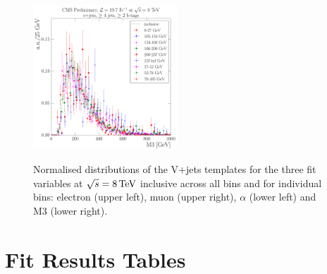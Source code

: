 \begin{figure}[hbtp]
     \includegraphics[width=0.48\textwidth]{Chapters/04_Analysis/04b_XSections/images/8TeV/fit_variables/WPT/M3/vjets/WPT_M3_2orMoreBtags_VJets_template_comparison.pdf}\\
	 \caption{Normalised distributions of the V+jets templates for the three fit variables at $\sqrt{s}=8\,\text{Te\hspace{-.08em}V}$
	 inclusive across all \wpt bins and for individual \wpt bins: electron \abseta (upper
	 left), muon \abseta (upper right), $\alpha$ (lower left) and M3 (lower right).}
     \label{fig:WPT_fit_variable_vjets_comparisons_8TeV}
\end{figure}


\clearpage
\section{Fit Results Tables}
\label{as:fit_results_tables}




\begin{landscape}


\end{landscape}

\clearpage
\begin{landscape}


\end{landscape}

\clearpage
\begin{landscape}


\end{landscape}

